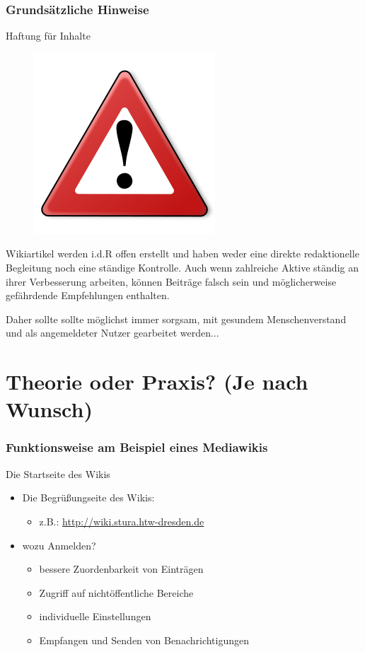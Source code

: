 \documentclass{beamer}              %
\begin{document}
\begin{frame}
  \frametitle{Grundsätzliche Hinweise}{Haftung für Inhalte}

  \begin{figure}
      \includegraphics[scale=0.25]{Warning_256px}
      \label{fig:Warnschild}
  \end{figure}  
 
  \begin{block}{}
    Wikiartikel werden i.d.R offen erstellt und haben weder eine direkte redaktionelle
    Begleitung noch eine ständige Kontrolle. Auch wenn zahlreiche Aktive
    ständig an ihrer Verbesserung arbeiten, können Beiträge falsch sein und
    möglicherweise gefährdende Empfehlungen enthalten.
  \end{block}
  \begin{block}{}
    Daher sollte sollte möglichst immer sorgsam, mit gesundem
    Menschenverstand und als angemeldeter Nutzer gearbeitet werden...
  \end{block}
\end{frame}

\section{Theorie oder Praxis? (Je nach Wunsch)}

\begin{frame}
  \frametitle{Funktionsweise am Beispiel eines Mediawikis}{Die Startseite des Wikis}

  \begin{itemize}[<+->]
    \item Die Begrüßungseite des Wikis:
    \begin{itemize}
      \item z.B.: \url{http://wiki.stura.htw-dresden.de}
    \end{itemize}
    \item wozu Anmelden?
    \begin{itemize}
      \item bessere Zuordenbarkeit von Einträgen
      \item Zugriff auf nichtöffentliche Bereiche
      \item individuelle Einstellungen
      \item Empfangen und Senden von Benachrichtigungen
    \end{itemize}
  \end{itemize}
\end{frame}
\end{document}
